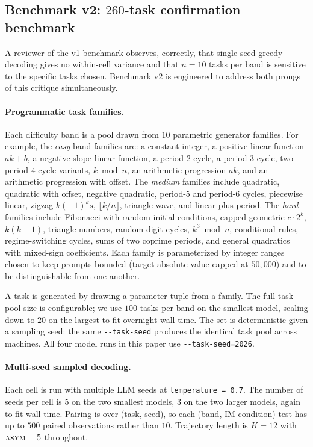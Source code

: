 \documentclass[11pt]{article}
\begin{document}
\subsection{Benchmark v2: $260$-task confirmation benchmark}
\label{sec:method-v2}

A reviewer of the v1 benchmark observes, correctly, that
single-seed greedy decoding gives no within-cell variance and that
$n = 10$ tasks per band is sensitive to the specific tasks chosen.
Benchmark v2 is engineered to address both prongs of this critique
simultaneously.

\paragraph{Programmatic task families.}  Each difficulty band is
a pool drawn from $10$ parametric generator families.  For example,
the \emph{easy} band families are: a constant integer, a positive
linear function $a k + b$, a negative-slope linear function, a
period-$2$ cycle, a period-$3$ cycle, two period-$4$ cycle variants,
$k \bmod n$, an arithmetic progression $a k$, and an arithmetic
progression with offset.  The \emph{medium} families include
quadratic, quadratic with offset, negative quadratic, period-$5$
and period-$6$ cycles, piecewise linear, zigzag $k(-1)^k s$,
$\lfloor k/n \rfloor$, triangle wave, and linear-plus-period.  The
\emph{hard} families include Fibonacci with random initial
conditions, capped geometric $c \cdot 2^k$, $k(k-1)$, triangle
numbers, random digit cycles, $k^3 \bmod n$, conditional rules,
regime-switching cycles, sums of two coprime periods, and general
quadratics with mixed-sign coefficients.  Each family is
parameterized by integer ranges chosen to keep prompts bounded
(target absolute value capped at $50{,}000$) and to be
distinguishable from one another.

A task is generated by drawing a parameter tuple from a family.
The full task pool size is configurable; we use $100$ tasks per
band on the smallest model, scaling down to $20$ on the largest
to fit overnight wall-time.  The set is deterministic given a
sampling seed: the same \verb|--task-seed| produces the identical
task pool across machines.  All four model runs in this paper
use \verb|--task-seed=2026|.

\paragraph{Multi-seed sampled decoding.}  Each cell is run with
multiple LLM seeds at \verb|temperature = 0.7|.  The number of
seeds per cell is $5$ on the two smallest models, $3$ on the two
larger models, again to fit wall-time.  Pairing is over (task,
seed), so each (band, IM-condition) test has up to $500$ paired
observations rather than $10$.  Trajectory length is $K = 12$ with
$\textsc{asym} = 5$ throughout.
\end{document}
